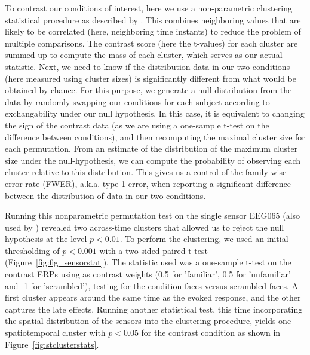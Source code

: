To contrast our conditions of interest, here we use a non-parametric clustering statistical procedure as described by \cite{maris_nonparametric_2007}. This combines neighboring values that are likely to be correlated (here, neighboring time instants) to reduce the problem of multiple comparisons. The contrast score (here the  t-values) for each cluster are summed up to compute the mass of each cluster, which serves as our actual statistic. Next, we need to know if the distribution data in our two conditions (here measured using cluster sizes) is significantly different from what would be obtained by chance. For this purpose, we generate a null distribution from the data by randomly swapping our conditions for each subject according to exchangability under our null hypothesis. In this case, it is equivalent to changing the sign of the contrast data (as we are using a one-sample t-test on the difference between conditions), and then recomputing the maximal cluster size for each permutation. From an estimate of the distribution of the maximum cluster size under the null-hypothesis, we can compute the probability of observing each cluster relative to this distribution. This gives us a control of the family-wise error rate (FWER), a.k.a. type 1 error, when reporting a significant difference between the distribution of data in our two conditions.

Running this nonparametric permutation test on the single sensor EEG065 (also used by \cite{wakeman2015multi}) revealed two across-time clusters that allowed us to reject the null hypothesis at the level $p < 0.01$. To perform the clustering, we used an initial thresholding of $p < 0.001$ with a two-sided paired t-test (Figure~\ref{fig:fig_sensorstat}). The statistic used was a one-sample t-test on the contrast ERPs using as contrast weights (0.5 for 'familiar', 0.5 for 'unfamiliar' and -1 for 'scrambled'), testing for the condition faces versus scrambled faces. A first cluster appears around the same time as the evoked response, and the other captures the late effects. Running another statistical test, this time incorporating the spatial distribution of the sensors into the clustering procedure, yields one spatiotemporal cluster with $p < 0.05$ for the contrast condition as shown in Figure~\ref{fig:stclusterstats}.

